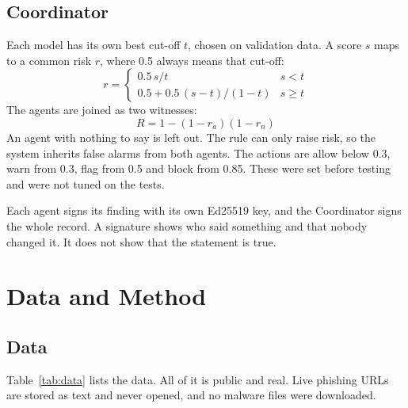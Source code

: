 \subsection{Coordinator}

Each model has its own best cut-off $t$, chosen on validation data. A score $s$ maps to a common risk $r$, where 0.5 always means that cut-off:
\begin{equation}
r = \begin{cases} 0.5\, s / t & s < t \\ 0.5 + 0.5\,(s-t)/(1-t) & s \ge t \end{cases}
\end{equation}
The agents are joined as two witnesses:
\begin{equation}
R = 1 - (1 - r_a)(1 - r_n)
\end{equation}
An agent with nothing to say is left out. The rule can only raise risk, so the system inherits false alarms from both agents. The actions are allow below 0.3, warn from 0.3, flag from 0.5 and block from 0.85. These were set before testing and were not tuned on the tests.

Each agent signs its finding with its own Ed25519 key, and the Coordinator signs the whole record. A signature shows who said something and that nobody changed it. It does not show that the statement is true.

\section{Data and Method}

\subsection{Data}

Table~\ref{tab:data} lists the data. All of it is public and real. Live phishing URLs are stored as text and never opened, and no malware files were downloaded.

